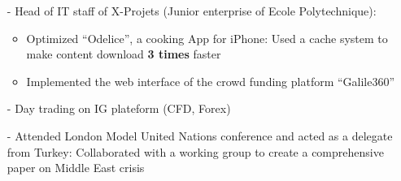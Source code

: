 \documentclass[letterpaper,11pt]{article}
\begin{document}
\begin{itemize}
\item[-] Head of IT staff of X-Projets (Junior enterprise of Ecole Polytechnique):\vspace{-5pt}
  \begin{itemize}
  \item Optimized ``Odelice'', a cooking App for iPhone: Used a cache system to make content download \textbf{3 times} faster
  \item Implemented the web interface of the crowd funding platform ``Galile360''
  \end{itemize}
\item[-] Day trading on IG plateform (CFD, Forex)
\item[-] Attended London Model United Nations conference and acted as a delegate from Turkey: Collaborated with a working group to create a comprehensive paper on Middle East crisis
\end{itemize}
\end{document}
